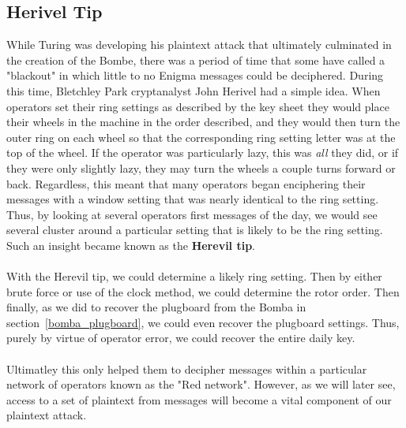 
\subsection{Herivel Tip}
While Turing was developing his plaintext attack that ultimately
culminated in the creation of the Bombe, there was a period of time
that some have called a "blackout" in which little to no Enigma
messages could be deciphered. During this time, Bletchley Park
cryptanalyst John Herivel had a simple idea. When operators set their
ring settings as described by the key sheet they would place their
wheels in the machine in the order described, and they would then
turn the outer ring on each wheel so that the corresponding ring
setting letter was at the top of the wheel. If the operator was
particularly lazy, this was \emph{all} they did, or if they were only
slightly lazy, they may turn the wheels a couple turns forward or
back. Regardless, this meant that many operators began enciphering
their messages with a window setting that was nearly identical to the
ring setting. Thus, by looking at several operators first messages of
the day, we would see several cluster around a particular setting
that is likely to be the ring setting. Such an insight became known
as the {\bf{Herevil tip}}.
\\\\With the Herevil tip, we could determine a likely ring setting.
Then by either brute force or use of the clock method, we could
determine the rotor order. Then finally, as we did to recover the
plugboard from the Bomba in section~\ref{bomba_plugboard}, we could
even recover the plugboard settings. Thus, purely by virtue of
operator error, we could recover the entire daily key.
\\\\Ultimatley this only helped them to decipher messages within a
particular network of operators known as the "Red network". However,
as we will later see, access to a set of plaintext from messages will
become a vital component of our plaintext attack.
